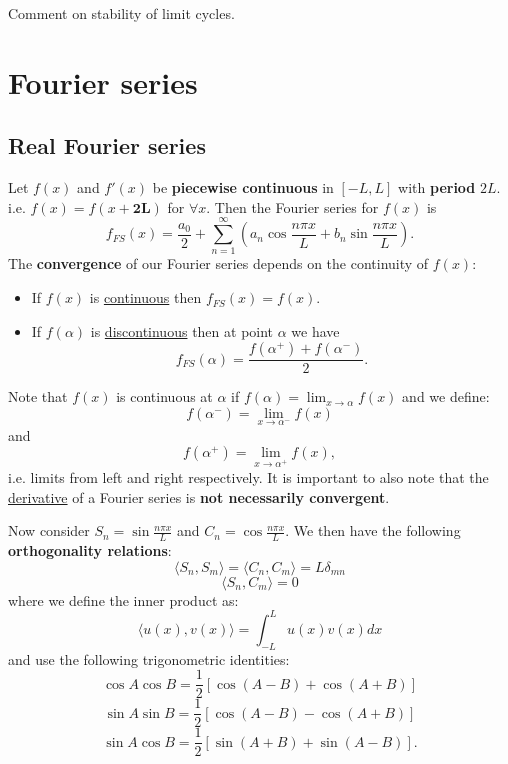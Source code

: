 \documentclass{article}
\begin{document}
Comment on stability of limit cycles.

\newpage

\section{Fourier series}

\subsection{Real Fourier series}
Let $f(x)$ and $f'(x)$ be \textbf{piecewise continuous} in $[-L, L]$ with \textbf{period} $2L$. \\
i.e. $f(x)=f(x+\boldsymbol{2L})$ for $\forall x$. Then the Fourier series for $f(x)$ is
$$f_{FS}(x)=\frac{a_0}{2}+\sum_{n=1}^{\infty}(a_n \cos\frac{n\pi x}{L}+b_n \sin\frac{n\pi x}{L}).$$
The \textbf{convergence} of our Fourier series depends on the continuity of $f(x)$:
\begin{itemize}
    \item If $f(x)$ is \underline{continuous} then $f_{FS}(x)=f(x)$.
    \item If $f(\alpha)$ is \underline{discontinuous} then at point $\alpha$ we have
    $$f_{FS}(\alpha)=\frac{f(\alpha^{+})+f(\alpha^{-})}{2}.$$
\end{itemize} 
Note that $f(x)$ is continuous at $\alpha$ if $f(\alpha)=\displaystyle\lim_{x\rightarrow\alpha}f(x)$ and we define:
$$f(\alpha^-)=\displaystyle\lim_{x\rightarrow\alpha^-}f(x)$$ and
$$f(\alpha^+)=\displaystyle\lim_{x\rightarrow\alpha^+}f(x),$$
i.e. limits from left and right respectively. It is important to also note that the \underline{derivative} of a Fourier series is \textbf{not necessarily convergent}.
    
Now consider $S_n = \sin\frac{n\pi x}{L}$ and $C_n = \cos\frac{n\pi x}{L}$. We then have the following \textbf{orthogonality relations}:
$$\langle S_n, S_m \rangle=\langle C_n, C_m \rangle=L\delta_{mn}$$
$$\langle S_n, C_m \rangle=0$$
where we define the inner product as:
$$\langle u(x), v(x) \rangle=\int_{-L}^{L} u(x)v(x)dx$$
and use the following trigonometric identities:
$$\cos A\cos B = \frac{1}{2}[\cos(A-B)+\cos(A+B)]$$
$$\sin A\sin B = \frac{1}{2}[\cos(A-B)-\cos(A+B)]$$
$$\sin A\cos B = \frac{1}{2}[\sin(A+B)+\sin(A-B)].$$

\newpage
\end{document}
